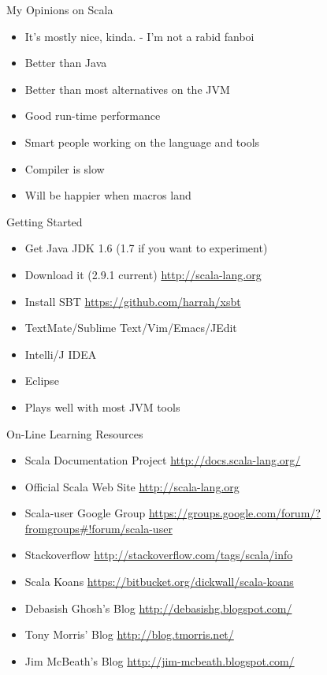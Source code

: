 \documentclass[14pt,t,usepdftitle=false,xcolornames=x11names,svgnames,dvipsnames,usenames]{beamer}
\newcommand{\tinyurl}[1]{
  {\tiny{\textcolor{keyword}{\url{#1}}}}}
\begin{document}
\begin{frame}{My Opinions on Scala}
  \begin{itemize}[<+->]
    \item It's mostly nice, kinda. - I'm not a rabid fanboi
    \item Better than Java
    \item Better than most alternatives on the JVM
    \item Good run-time performance
    \item Smart people working on the language and tools
    \item Compiler is slow
    \item Will be happier when macros land
  \end{itemize}
\end{frame}

\begin{frame}{Getting Started}
  \begin{itemize}[<+->]
    \item Get Java JDK 1.6 (1.7 if you want to experiment)
    \item Download it (2.9.1 current) \tinyurl{http://scala-lang.org}
    \item Install SBT \tinyurl{https://github.com/harrah/xsbt}
    \item TextMate/Sublime Text/Vim/Emacs/JEdit
    \item Intelli/J IDEA
    \item Eclipse
    \item Plays well with most JVM tools
  \end{itemize}
\end{frame}

\begin{frame}{On-Line Learning Resources}
  \begin{itemize}[<+->]
    \item Scala Documentation Project \tinyurl{http://docs.scala-lang.org/}
    \item Official Scala Web Site \tinyurl{http://scala-lang.org}
    \item Scala-user Google Group \tinyurl{https://groups.google.com/forum/?fromgroups\#!forum/scala-user}
    \item Stackoverflow \tinyurl{http://stackoverflow.com/tags/scala/info}
    \item Scala Koans \tinyurl{https://bitbucket.org/dickwall/scala-koans}
    \item Debasish Ghosh's Blog \tinyurl{http://debasishg.blogspot.com/}
    \item Tony Morris' Blog \tinyurl{http://blog.tmorris.net/}
    \item Jim McBeath's Blog \tinyurl{http://jim-mcbeath.blogspot.com/}
  \end{itemize}
\end{frame}
\end{document}
